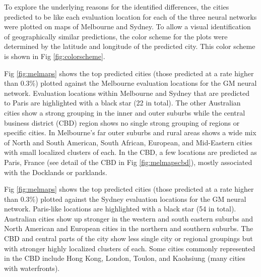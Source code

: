 \documentclass[10pt,letterpaper,hidelinks]{article}
\begin{document}
To explore the underlying reasons for the identified differences, the cities predicted to be like each evaluation location for each of the three neural networks were plotted on maps of Melbourne and Sydney. To allow a visual identification of geographically similar predictions, the color scheme for the plots were determined by the latitude and longitude of the predicted city. This color scheme is shown in Fig \ref{fig:colorscheme}. 




Fig \ref{fig:melmaps} shows the top predicted cities (those predicted at a rate higher than 0.3\%) plotted against the Melbourne evaluation locations for the GM neural network. Evaluation locations within Melbourne and Sydney that are predicted to Paris are highlighted with a black star (22 in total). The other Australian cities show a strong grouping in the inner and outer suburbs while the central business district (CBD) region shows no single strong grouping of regions or specific cities. In Melbourne's far outer suburbs and rural areas shows a wide mix of North and South American, South African, European, and Mid-Eastern cities with small localized clusters of each. In the CBD, a few locations are predicted as Paris, France (see detail of the CBD in Fig \ref{fig:melmapscbd}), mostly associated with the Docklands or parklands.

Fig \ref{fig:melmaps} shows the top predicted cities (those predicted at a rate higher than 0.3\%) plotted against the Sydney evaluation locations for the GM neural network. Paris-like locations are highlighted with a black star (54 in total).  Australian cities show up stronger in the western and south eastern suburbs and North American and European cities in the northern and southern suburbs. The CBD and central parts of the city show less single city or regional groupings but with stronger highly localized clusters of each. Some cities commonly represented in the CBD include Hong Kong, London, Toulon, and Kaohsiung (many cities with waterfronts). 
\end{document}
